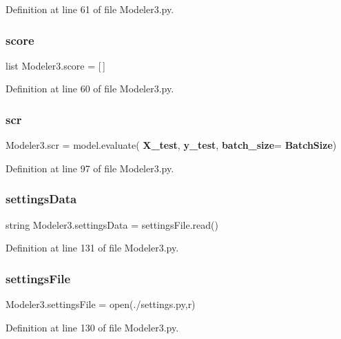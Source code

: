Definition at line 61 of file Modeler3.\+py.

\mbox{\label{namespace_modeler3_ae9bc74508243e74b5104703570a8432d}} 
\subsubsection{score}
{\footnotesize\ttfamily list Modeler3.\+score = [$\,$]}



Definition at line 60 of file Modeler3.\+py.

\mbox{\label{namespace_modeler3_a91036327fc877a476df80bea47ed7d67}} 
\subsubsection{scr}
{\footnotesize\ttfamily Modeler3.\+scr = model.\+evaluate(\textbf{ X\+\_\+test}, \textbf{ y\+\_\+test}, \textbf{ batch\+\_\+size}=\textbf{ Batch\+Size})}



Definition at line 97 of file Modeler3.\+py.

\mbox{\label{namespace_modeler3_adeb344a3d44a9624e21310676964f932}} 
\subsubsection{settings\+Data}
{\footnotesize\ttfamily string Modeler3.\+settings\+Data = settings\+File.\+read()}



Definition at line 131 of file Modeler3.\+py.

\mbox{\label{namespace_modeler3_ac28e69c92c93d0fc4c7f31906b21a681}} 
\subsubsection{settings\+File}
{\footnotesize\ttfamily Modeler3.\+settings\+File = open(\textquotesingle{}./settings.\+py\textquotesingle{},\textquotesingle{}r\textquotesingle{})}



Definition at line 130 of file Modeler3.\+py.

